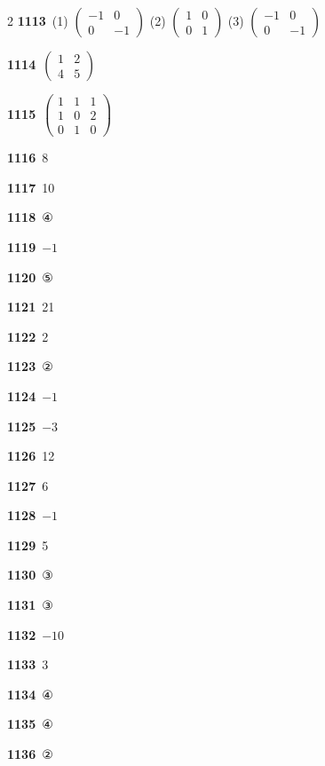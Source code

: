 \documentclass[10pt,a4paper]{article}
\begin{document}
\begin{multicols}{2}
\noindent\textbf{1113}\ (1) $\begin{pmatrix} -1 & 0 \\ 0 & -1 \end{pmatrix}$ (2) $\begin{pmatrix} 1 & 0 \\ 0 & 1 \end{pmatrix}$ (3) $\begin{pmatrix} -1 & 0 \\ 0 & -1 \end{pmatrix}$\par
\noindent\textbf{1114}\ $\begin{pmatrix} 1 & 2 \\ 4 & 5 \end{pmatrix}$\par
\noindent\textbf{1115}\ $\begin{pmatrix} 1 & 1 & 1 \\ 1 & 0 & 2 \\ 0 & 1 & 0 \end{pmatrix}$\par
\noindent\textbf{1116}\ 8\par
\noindent\textbf{1117}\ 10\par
\noindent\textbf{1118}\ ④\par
\noindent\textbf{1119}\ $-1$\par
\noindent\textbf{1120}\ ⑤\par
\noindent\textbf{1121}\ 21\par
\noindent\textbf{1122}\ 2\par
\noindent\textbf{1123}\ ②\par
\noindent\textbf{1124}\ $-1$\par
\noindent\textbf{1125}\ $-3$\par
\noindent\textbf{1126}\ 12\par
\noindent\textbf{1127}\ 6\par
\noindent\textbf{1128}\ $-1$\par
\noindent\textbf{1129}\ 5\par
\noindent\textbf{1130}\ ③\par
\noindent\textbf{1131}\ ③\par
\noindent\textbf{1132}\ $-10$\par
\noindent\textbf{1133}\ 3\par
\noindent\textbf{1134}\ ④\par
\noindent\textbf{1135}\ ④\par
\noindent\textbf{1136}\ ②\par

\end{multicols}
\end{document}
